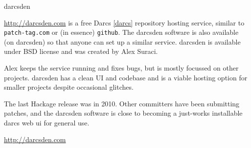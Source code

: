 \begin{hcarentry}[new]{darcsden}
\makeheader

\url{http://darcsden.com} is a free Darcs \cref{darcs} repository
hosting service, similar to \texttt{patch-tag.com} or (in essence)
\texttt{github}. The darcsden software is also available (on darcsden)
so that anyone can set up a similar service. darcsden is available
under BSD license and was created by Alex Suraci.

Alex keeps the service running and fixes bugs, but is mostly focussed
on other projects. darcsden has a clean UI and codebase and is a
viable hosting option for smaller projects despite occasional
glitches.

The last Hackage release was in 2010. Other committers have been
submitting patches, and the darcsden software is close to becoming a
just-works installable darcs web ui for general use.

\FurtherReading
  \url{http://darcsden.com}
\end{hcarentry}
